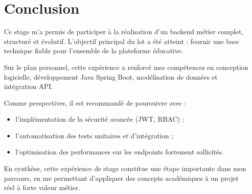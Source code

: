 \chapter*{Conclusion}

Ce stage m'a permis de participer à la réalisation d'un backend métier complet, structuré et évolutif. L'objectif principal du lot a été atteint : fournir une base technique fiable pour l'ensemble de la plateforme éducative.

Sur le plan personnel, cette expérience a renforcé mes compétences en conception logicielle, développement Java Spring Boot, modélisation de données et intégration API.

Comme perspectives, il est recommandé de poursuivre avec :
\begin{itemize}
	\item l'implémentation de la sécurité avancée (JWT, RBAC) ;
	\item l'automatisation des tests unitaires et d'intégration ;
	\item l'optimisation des performances sur les endpoints fortement sollicités.
\end{itemize}

En synthèse, cette expérience de stage constitue une étape importante dans mon parcours, en me permettant d'appliquer des concepts académiques à un projet réel à forte valeur métier.
